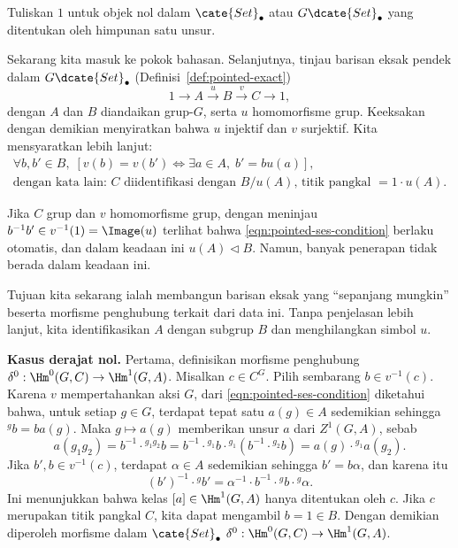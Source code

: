 \begin{konvensi}
	Tuliskan $1$ untuk objek nol dalam $\cate{Set}_\bullet$ atau
	$G\dcate{Set}_\bullet$ yang ditentukan oleh himpunan satu unsur.
\end{konvensi}

Sekarang kita masuk ke pokok bahasan. Selanjutnya, tinjau barisan eksak pendek
dalam $G\dcate{Set}_\bullet$ (Definisi~\ref{def:pointed-exact})
\[ 1 \to A \xrightarrow{u} B \xrightarrow{v} C \to 1, \]
dengan $A$ dan $B$ diandaikan grup-$G$, serta $u$ homomorfisme grup.
Keeksakan dengan demikian menyiratkan bahwa $u$ injektif dan $v$ surjektif.
Kita mensyaratkan lebih lanjut:
\begin{equation}\label{eqn:pointed-ses-condition}
	\begin{gathered}
		\forall b, b' \in B, \; \left[ v(b) = v(b') \iff \exists a \in A, \; b' = b u(a) \right], \\
		\text{dengan kata lain: $C$ diidentifikasi dengan $B/u(A)$, titik pangkal $= 1 \cdot u(A)$.}
	\end{gathered}
\end{equation}

Jika $C$ grup dan $v$ homomorfisme grup, dengan meninjau
$b^{-1}b'\in v^{-1}(1)=\Image(u)$ terlihat bahwa
\eqref{eqn:pointed-ses-condition} berlaku otomatis, dan dalam keadaan ini
$u(A)\lhd B$. Namun, banyak penerapan tidak berada dalam keadaan ini.

Tujuan kita sekarang ialah membangun barisan eksak yang ``sepanjang mungkin''
beserta morfisme penghubung terkait dari data ini. Tanpa penjelasan lebih
lanjut, kita identifikasikan $A$ dengan subgrup $B$ dan menghilangkan simbol
$u$.

\textbf{Kasus derajat nol.}\;
Pertama, definisikan morfisme penghubung
$\delta^0:\Hm^0(G,C)\to\Hm^1(G,A)$. Misalkan $c\in C^G$. Pilih sembarang
$b\in v^{-1}(c)$. Karena $v$ mempertahankan aksi $G$, dari
\eqref{eqn:pointed-ses-condition} diketahui bahwa, untuk setiap $g\in G$,
terdapat tepat satu $a(g)\in A$ sedemikian sehingga ${}^gb=ba(g)$. Maka
$g\mapsto a(g)$ memberikan unsur $a$ dari $Z^1(G,A)$, sebab
\[ a(g_1 g_2) = b^{-1} \cdot {}^{g_1 g_2} b = b^{-1} \cdot {}^{g_1} b \cdot {}^{g_1} (b^{-1} \cdot {}^{g_2} b) = a(g) \cdot {}^{g_1} a(g_2). \]
Jika $b',b\in v^{-1}(c)$, terdapat $\alpha\in A$ sedemikian sehingga
$b'=b\alpha$, dan karena itu
\[ (b')^{-1} \cdot {}^g b' = \alpha^{-1} \cdot b^{-1} \cdot {}^g b \cdot {}^g \alpha. \]
Ini menunjukkan bahwa kelas $[a]\in\Hm^1(G,A)$ hanya ditentukan oleh $c$.
Jika $c$ merupakan titik pangkal $C$, kita dapat mengambil $b=1\in B$.
Dengan demikian diperoleh morfisme dalam $\cate{Set}_\bullet$
$\delta^0:\Hm^0(G,C)\to\Hm^1(G,A)$.

